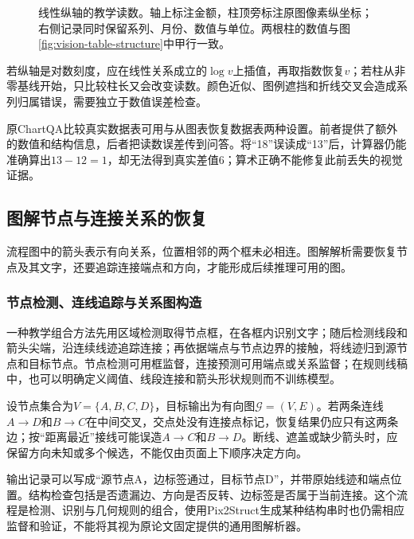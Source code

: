 \begin{figure}[htbp]
  \centering
  
  \caption{线性纵轴的教学读数。轴上标注金额，柱顶旁标注原图像素纵坐标；右侧记录同时保留系列、月份、数值与单位。两根柱的数值与图\ref{fig:vision-table-structure}中甲行一致。}
  \label{fig:vision-chart-reading}
\end{figure}
\FloatBarrier

若纵轴是对数刻度，应在线性关系成立的$\log v$上插值，再取指数恢复$v$；若柱从非零基线开始，只比较柱长又会改变读数。颜色近似、图例遮挡和折线交叉会造成系列归属错误，需要独立于数值误差检查。

原ChartQA比较真实数据表可用与从图表恢复数据表两种设置。前者提供了额外的数值和结构信息，后者把读数误差传到问答。将“18”误读成“13”后，计算器仍能准确算出$13-12=1$，却无法得到真实差值6；算术正确不能修复此前丢失的视觉证据。

\subsection{图解节点与连接关系的恢复}
\label{sec:vision-understanding-diagrams}

流程图中的箭头表示有向关系，位置相邻的两个框未必相连。图解解析需要恢复节点及其文字，还要追踪连接端点和方向，才能形成后续推理可用的图。

\subsubsection{节点检测、连线追踪与关系图构造}
\label{sec:vision-understanding-diagram-graph}

一种教学组合方法先用区域检测取得节点框，在各框内识别文字；随后检测线段和箭头尖端，沿连续线迹追踪连接；再依据端点与节点边界的接触，将线迹归到源节点和目标节点。节点检测可用框监督，连接预测可用端点或关系监督；在规则线稿中，也可以明确定义阈值、线段连接和箭头形状规则而不训练模型。

设节点集合为$V=\{A,B,C,D\}$，目标输出为有向图$\mathcal G=(V,E)$。若两条连线$A\to D$和$B\to C$在中间交叉，交点处没有连接点标记，恢复结果仍应只有这两条边；按“距离最近”接线可能误造$A\to C$和$B\to D$。断线、遮盖或缺少箭头时，应保留方向未知或多个候选，不能仅由页面上下顺序决定方向。

输出记录可以写成“源节点A，边标签通过，目标节点D”，并带原始线迹和端点位置。结构检查包括是否遗漏边、方向是否反转、边标签是否属于当前连接。这个流程是检测、识别与几何规则的组合，使用Pix2Struct生成某种结构串时也仍需相应监督和验证，不能将其视为原论文固定提供的通用图解析器。

